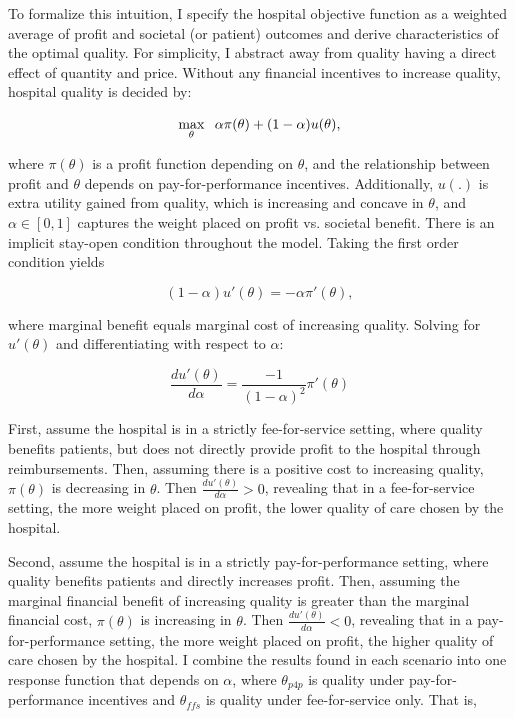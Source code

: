 \documentclass[12pt]{article}
\begin{document}
    To formalize this intuition, I specify the hospital objective function as a weighted average of profit and societal (or patient) outcomes and derive characteristics of the optimal quality. For simplicity, I abstract away from quality having a direct effect of quantity and price. Without any financial incentives to increase quality, hospital quality is decided by:  
    
    $$\max_{\theta}\hspace{2mm}\alpha\pi(\theta) + (1-\alpha) u(\theta),$$

    \noindent where $\pi(\theta)$ is a profit function depending on $\theta$, and the relationship between profit and $\theta$ depends on pay-for-performance incentives. Additionally, $u(.)$ is extra utility gained from quality, which is increasing and concave in $\theta$, and $\alpha\in[0,1]$ captures the weight placed on profit vs. societal benefit. There is an implicit stay-open condition throughout the model. Taking the first order condition yields 

    $$(1-\alpha)u'(\theta) = -\alpha \pi'(\theta),$$

    \noindent where marginal benefit equals marginal cost of increasing quality. Solving for $u'(\theta)$ and differentiating with respect to $\alpha$:

    $$\frac{du'(\theta)}{d\alpha} = \frac{-1}{(1-\alpha)^2}\pi'(\theta)$$

    First, assume the hospital is in a strictly fee-for-service setting, where quality benefits patients, but does not directly provide profit to the hospital through reimbursements. Then, assuming there is a positive cost to increasing quality, $\pi(\theta)$ is decreasing in $\theta$. Then $\frac{du'(\theta)}{d\alpha} > 0$, revealing that in a fee-for-service setting, the more weight placed on profit, the lower quality of care chosen by the hospital.

    Second, assume the hospital is in a strictly pay-for-performance setting, where quality benefits patients and directly increases profit. Then, assuming the marginal financial benefit of increasing quality is greater than the marginal financial cost, $\pi(\theta)$ is increasing in $\theta$. Then $\frac{du'(\theta)}{d\alpha} < 0$, revealing that in a pay-for-performance setting, the more weight placed on profit, the higher quality of care chosen by the hospital. I combine the results found in each scenario into one response function that depends on $\alpha$, where $\theta_{p4p}$ is quality under pay-for-performance incentives and $\theta_{ffs}$ is quality under fee-for-service only. That is, 
\end{document}
